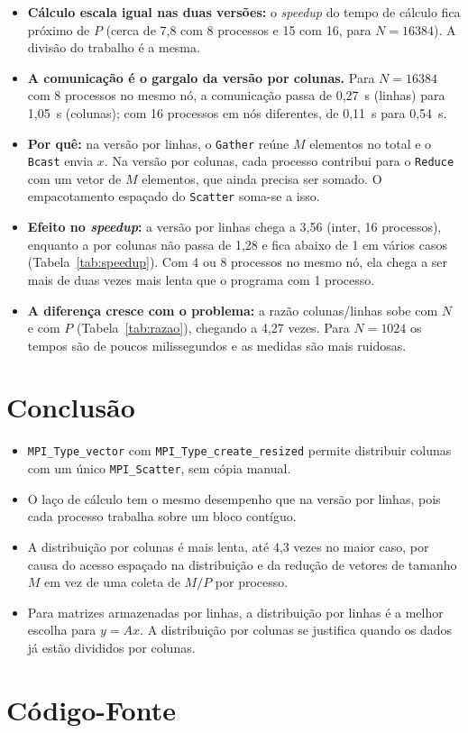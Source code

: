 \documentclass[a4paper,12pt]{article}
\begin{document}
\begin{itemize}
    \item \textbf{Cálculo escala igual nas duas versões:} o \emph{speedup} do tempo de cálculo fica próximo de $P$ (cerca de 7,8 com 8 processos e 15 com 16, para $N = 16384$). A divisão do trabalho é a mesma.
    \item \textbf{A comunicação é o gargalo da versão por colunas.} Para $N=16384$ com 8 processos no mesmo nó, a comunicação passa de 0,27~s (linhas) para 1,05~s (colunas); com 16 processos em nós diferentes, de 0,11~s para 0,54~s.
    \item \textbf{Por quê:} na versão por linhas, o \texttt{Gather} reúne $M$ elementos no total e o \texttt{Bcast} envia $x$. Na versão por colunas, cada processo contribui para o \texttt{Reduce} com um vetor de $M$ elementos, que ainda precisa ser somado. O empacotamento espaçado do \texttt{Scatter} soma-se a isso.
    \item \textbf{Efeito no \emph{speedup}:} a versão por linhas chega a 3,56 (inter, 16 processos), enquanto a por colunas não passa de 1,28 e fica abaixo de 1 em vários casos (Tabela~\ref{tab:speedup}). Com 4 ou 8 processos no mesmo nó, ela chega a ser mais de duas vezes mais lenta que o programa com 1 processo.
    \item \textbf{A diferença cresce com o problema:} a razão colunas/linhas sobe com $N$ e com $P$ (Tabela~\ref{tab:razao}), chegando a 4,27 vezes. Para $N=1024$ os tempos são de poucos milissegundos e as medidas são mais ruidosas.
\end{itemize}

\section{Conclusão}

\begin{itemize}
    \item \texttt{MPI\_Type\_vector} com \texttt{MPI\_Type\_create\_resized} permite distribuir colunas com um único \texttt{MPI\_Scatter}, sem cópia manual.
    \item O laço de cálculo tem o mesmo desempenho que na versão por linhas, pois cada processo trabalha sobre um bloco contíguo.
    \item A distribuição por colunas é mais lenta, até 4,3 vezes no maior caso, por causa do acesso espaçado na distribuição e da redução de vetores de tamanho $M$ em vez de uma coleta de $M/P$ por processo.
    \item Para matrizes armazenadas por linhas, a distribuição por linhas é a melhor escolha para $y = Ax$. A distribuição por colunas se justifica quando os dados já estão divididos por colunas.
\end{itemize}

\newpage
\appendix

\section{Código-Fonte}


\end{document}
